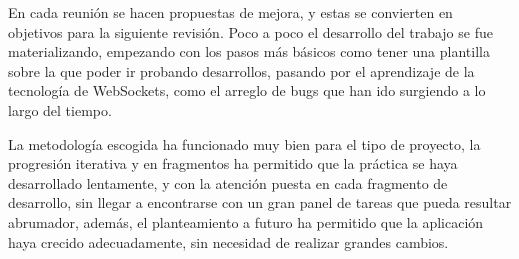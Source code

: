 En cada reunión se hacen propuestas de mejora, y estas se convierten en objetivos para la siguiente revisión. Poco a poco el desarrollo del trabajo se fue materializando, empezando con los pasos más básicos como tener una plantilla sobre la que poder ir probando desarrollos, pasando por el aprendizaje de la tecnología de WebSockets, como el arreglo de bugs que han ido surgiendo a lo largo del tiempo.

La metodología escogida ha funcionado muy bien para el tipo de proyecto, la progresión iterativa y en fragmentos ha permitido que la práctica se haya desarrollado lentamente, y con la atención puesta en cada fragmento de desarrollo, sin llegar a encontrarse con un gran panel de tareas que pueda resultar abrumador, además, el planteamiento a futuro ha permitido que la aplicación haya crecido adecuadamente, sin necesidad de realizar grandes cambios.

